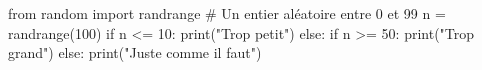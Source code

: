 \begin{pyverbatim}
from random import randrange
# Un entier aléatoire entre 0 et 99
n = randrange(100) 
if n <= 10:
    print("Trop petit")
else:
    if n >= 50:
        print("Trop grand")
    else:
        print("Juste comme il faut")
\end{pyverbatim}